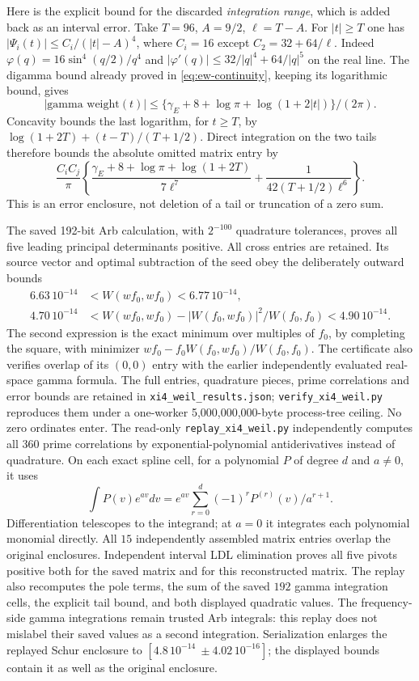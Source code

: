 Here is the explicit bound for the discarded \emph{integration
range}, which is added back as an interval error.
Take $T=96$, $A=9/2$, $\ell=T-A$.
For $|t|\ge T$ one has $|\Psi_i(t)|\le C_i/(|t|-A)^4$,
where $C_i=16$ except $C_2=32+64/\ell$.
Indeed $\varphi(q)=16\sin^4(q/2)/q^4$ and
$|\varphi'(q)|\le32/|q|^4+64/|q|^5$ on the real line.
The digamma bound already proved in
\eqref{eq:ew-continuity}, keeping its logarithmic bound, gives
\[
 |\text{gamma weight}(t)|
 \le\{\gamma_E+8+\log\pi+\log(1+2|t|)\}/(2\pi).
\]
Concavity bounds the last logarithm, for $t\ge T$, by
$\log(1+2T)+(t-T)/(T+1/2)$. Direct integration on the two tails
therefore bounds the absolute omitted matrix entry by
\begin{equation}
 \frac{C_iC_j}{\pi}
 \left\{\frac{\gamma_E+8+\log\pi+\log(1+2T)}{7\ell^7}
                +\frac1{42(T+1/2)\ell^6}\right\}.
 \label{eq:xw-gamma-tail}
\end{equation}
This is an error enclosure, not deletion of a tail or truncation
of a zero sum.

The saved 192-bit Arb calculation, with $2^{-100}$ quadrature
tolerances, proves all five leading principal determinants positive.
All cross entries are retained. Its source vector and optimal
subtraction of the seed obey the deliberately outward bounds
\begin{align*}
 6.63\,10^{-14}&<W(wf_0,wf_0)<6.77\,10^{-14},\\
 4.70\,10^{-14}
 &<W(wf_0,wf_0)-|W(f_0,wf_0)|^2/W(f_0,f_0)
                                                    <4.90\,10^{-14}.
\end{align*}
The second expression is the exact minimum over multiples of $f_0$,
by completing the square, with minimizer
$wf_0-f_0W(f_0,wf_0)/W(f_0,f_0)$.
The certificate also verifies overlap of its $(0,0)$ entry with
the earlier independently evaluated real-space gamma formula.
The full entries, quadrature pieces, prime correlations and error
bounds are retained in \texttt{xi4\_weil\_results.json};
\texttt{verify\_xi4\_weil.py} reproduces them under a one-worker
5,000,000,000-byte process-tree ceiling. No zero ordinates enter.
The read-only \texttt{replay\_xi4\_weil.py} independently computes
all $360$ prime correlations by exponential-polynomial
antiderivatives instead of quadrature. On each exact spline cell,
for a polynomial $P$ of degree $d$ and $a\ne0$, it uses
\[
 \int P(v)e^{av}dv
   =e^{av}\sum_{r=0}^{d}(-1)^rP^{(r)}(v)/a^{r+1}.
\]
Differentiation telescopes to the integrand; at $a=0$ it integrates
each polynomial monomial directly. All $15$ independently assembled
matrix entries overlap the original enclosures. Independent
interval LDL elimination proves all five pivots positive both for
the saved matrix and for this reconstructed matrix. The replay
also recomputes the pole terms, the sum of the saved $192$ gamma
integration cells, the explicit tail bound, and both displayed
quadratic values. The frequency-side gamma integrations remain
trusted Arb integrals: this replay does not mislabel their saved
values as a second integration. Serialization enlarges the
replayed Schur enclosure to $[4.8\,10^{-14}\ \pm4.02\,10^{-16}]$;
the displayed bounds contain it as well as the original enclosure.

